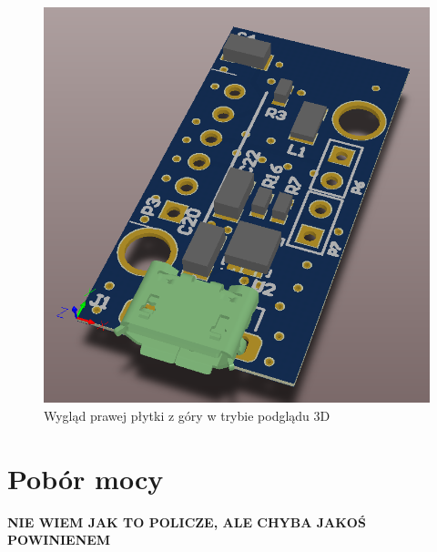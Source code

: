 \begin{figure}[H]
	\centering
	\includegraphics[scale=0.4]{zdjecia/PCB/PCB_right_3D.png}
	\caption{\label{PCB_right_3D} Wygląd prawej płytki z góry w trybie podglądu 3D}
\end{figure}

\section{Pobór mocy}
\label{cha:pobor_mocy}

\textbf{NIE WIEM JAK TO POLICZE, ALE CHYBA JAKOŚ POWINIENEM}


